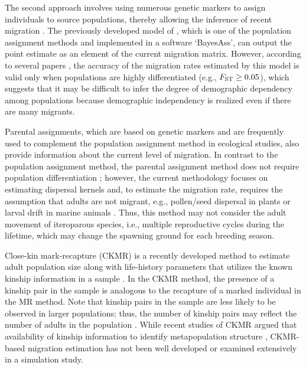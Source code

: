 \documentclass[12pt, English]{article}
\begin{document}
\begin{spacing}{1.9}

The second approach involves using numerous genetic markers to assign individuals to source populations, thereby allowing the inference of recent migration \cite[since][]{https://doi.org/10.1111/j.1365-294X.1995.tb00227.x}. The previously developed model of \cite{Wilson_2003}, which is one of the population assignment methods and implemented in a software `BayesAss', can output the point estimate as an element of the current migration matrix. However, according to several papers \cite[]{https://doi.org/10.1111/j.1365-294X.2007.03218.x, https://doi.org/10.1111/mec.12806}, the accuracy of the migration rates estimated by this model is valid only when populations are highly differentiated (e.g., $F_{\rm ST}\ge0.05$), which suggests that it may be difficult to infer the degree of demographic dependency among populations because demographic independency is realized even if there are many migrants. 


Parental assignments, which are based on genetic markers and are frequently used to complement the population assignment method in ecological studies, also provide information about the current level of migration. In contrast to the population assignment method, the parental assignment method does not require population differentiation \cite[]{https://doi.org/10.1111/mec.12806}; however, the current methodology focuses on estimating dispersal kernels and, to estimate the migration rate, requires the assumption that adults are not migrant, e.g., pollen/seed dispersal in plants \cite[]{doi:10.1080/07352689.2010.481167} or larval drift in marine animals \cite[]{https://doi.org/10.1111/eva.12288}. Thus, this method may not consider the adult movement of iteroparous species, i.e., multiple reproductive cycles during the lifetime, which may change the spawning ground for each breeding season. 


Close-kin mark-recapture (CKMR) is a recently developed method to estimate adult population size along with life-history parameters that utilizes the known kinship information in a sample \cite[][and references therein]{https://doi.org/10.1111/faf.12615}. In the CKMR method, the presence of a kinship pair in the sample is analogous to the recapture of a marked individual in the MR method. Note that kinship pairs in the sample are less likely to be observed in larger populations; thus, the number of kinship pairs may reflect the number of adults in the population \cite[]{bravington2016close}. While recent studies of CKMR argued that availability of kinship information to identify metapopulation structure \cite[]{https://doi.org/10.1002/ece3.6296, 10.1093/icesjms/fsac002}, CKMR-based migration estimation has not been well developed or examined extensively in a simulation study. 


\end{spacing}
\end{document}
